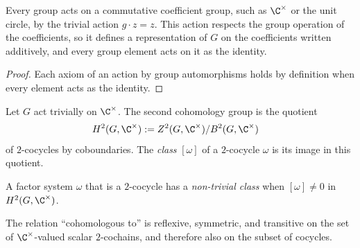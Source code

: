 \begin{lemma}
    \label{lem:scalar_cohomology_trivial_action}
    \leanok
    Every group acts on a commutative coefficient group, such as $\C^\times$
    or the unit circle, by the trivial action $g\cdot z=z$. This action
    respects the group operation of the coefficients, so it defines a
    representation of $G$ on the coefficients written additively, and every
    group element acts on it as the identity.
\end{lemma}

\begin{proof}\leanok
    Each axiom of an action by group automorphisms holds by definition when
    every element acts as the identity.
\end{proof}

\begin{definition}\label{def:h2_cx}
    \mathlibok
    Let $G$ act trivially on $\C^{\times}$. The second cohomology group
    is the quotient
    \begin{align}
        H^2(G,\C^{\times})
         & :=Z^2(G,\C^{\times})/B^2(G,\C^{\times})
        \label{eq:symmetry_h2_quotient}
    \end{align}
    of $2$-cocycles by coboundaries. The \emph{class} $[\omega]$ of a
    $2$-cocycle $\omega$ is its image in this quotient.
\end{definition}

\begin{definition}\label{def:nontrivial_class}
    \mathlibok
    A factor system $\omega$ that is a $2$-cocycle has a \emph{non-trivial
        class} when $[\omega]\neq 0$ in $H^2(G,\C^{\times})$.
\end{definition}

\begin{lemma}%
    \label{thm:cohomologous_equivalence}
    \leanok
    The relation ``cohomologous to'' is reflexive, symmetric, and
    transitive on the set of $\C^\times$-valued scalar $2$-cochains, and
    therefore also on the subset of cocycles.
\end{lemma}

